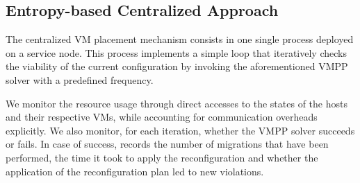 \subsection{Entropy-based Centralized Approach}
\label{subsec:entropy}
The centralized VM placement mechanism consists in one single \sg
process deployed on a service node. This process implements a simple loop that
iteratively checks the viability of the current configuration by
invoking the aforementioned VMPP solver with a predefined
frequency.


We monitor the resource usage through direct accesses
to the states of the hosts and their respective VMs, while accounting
for communication overheads explicitly. 
%
%
We also monitor, for each iteration, whether the VMPP solver succeeds
or fails. In case of success, \vmps records the number of migrations
that have been performed, the time it took to apply the
reconfiguration and whether the application of the reconfiguration
plan led to new violations.

